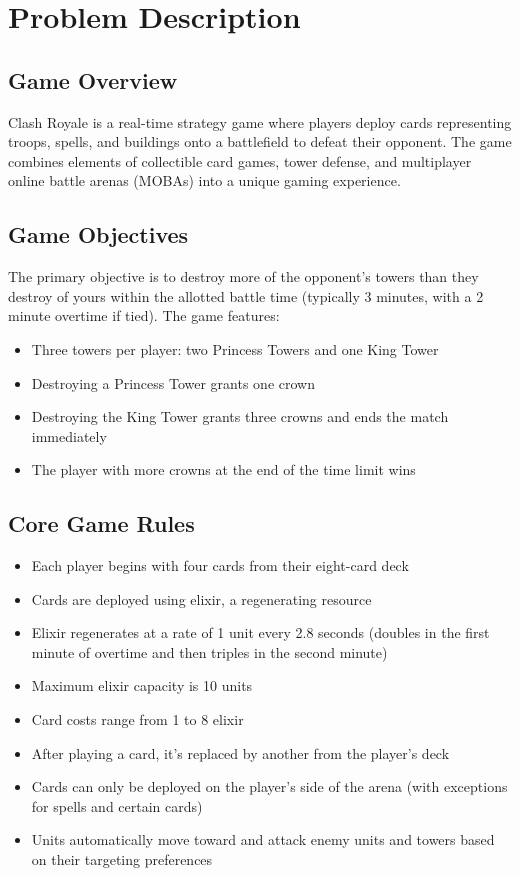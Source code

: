 \documentclass{article}
\begin{document}
\section{Problem Description}

\subsection{Game Overview}
Clash Royale is a real-time strategy game where players deploy cards representing troops, spells, and buildings onto a battlefield to defeat their opponent. The game combines elements of collectible card games, tower defense, and multiplayer online battle arenas (MOBAs) into a unique gaming experience.

\subsection{Game Objectives}
The primary objective is to destroy more of the opponent's towers than they destroy of yours within the allotted battle time (typically 3 minutes, with a 2 minute overtime if tied). The game features:
\begin{itemize}
    \item Three towers per player: two Princess Towers and one King Tower
    \item Destroying a Princess Tower grants one crown
    \item Destroying the King Tower grants three crowns and ends the match immediately
    \item The player with more crowns at the end of the time limit wins
\end{itemize}

\subsection{Core Game Rules}
\begin{itemize}
    \item Each player begins with four cards from their eight-card deck
    \item Cards are deployed using elixir, a regenerating resource
    \item Elixir regenerates at a rate of 1 unit every 2.8 seconds (doubles in the first minute of overtime and then triples in the second minute)
    \item Maximum elixir capacity is 10 units
    \item Card costs range from 1 to 8 elixir
    \item After playing a card, it's replaced by another from the player's deck
    \item Cards can only be deployed on the player's side of the arena (with exceptions for spells and certain cards)
    \item Units automatically move toward and attack enemy units and towers based on their targeting preferences
\end{itemize}
\end{document}
